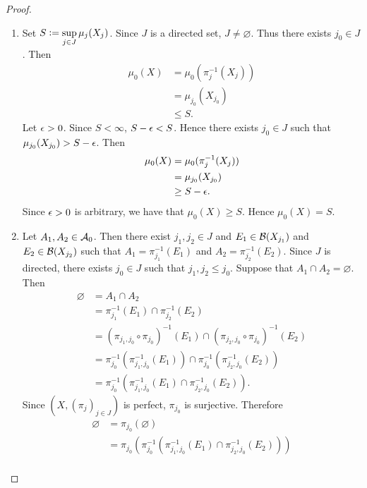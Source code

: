 \documentclass{book}
\begin{document}
\begin{proof}
\begin{enumerate}
\begin{align*}
				& = \mu_0((\pi_{j_2, j_0} \circ \pi_{j_0})^{-1}(E_2)) \\
				& = \mu_0(\pi_{j_2}^{-1}(E_2)) \\
				& = \mu_0(A_2).
			\end{align*}
			Thus $\mu_0$ is well-defined.
			\item Set $S \vcentcolon= \sup\limits_{j \in J} \mu_j(X_j)$. Since $J$ is a directed set, $J \neq \varnothing$. Thus there exists $j_0 \in J$. Then
			\begin{align*}
				\mu_0(X) 
				& = \mu_0(\pi_j^{-1}(X_j)) \\
				& = \mu_{j_0}(X_{j_0}) \\
				& \leq S.
			\end{align*}
			Let $\epsilon > 0$. Since $S < \infty$, $S - \epsilon < S$. Hence there exists $j_0 \in J$ such that $\mu_{j_0}(X_{j_0}) > S - \epsilon$. Then 
			\begin{align*}
				\mu_0(X) 
				& = \mu_0(\pi_j^{-1}(X_j)) \\
				& = \mu_{j_0}(X_{j_0}) \\
				& \geq S - \epsilon.
			\end{align*}
			Since $\epsilon > 0$ is arbitrary, we have that $\mu_0(X) \geq S$. Hence $\mu_0(X) = S$.
			\item Let $A_1, A_2 \in \mathcal{A}_0$. Then there exist $j_1, j_2 \in J$ and $E_1 \in \mathcal{B}(X_{j_1})$ and $E_2 \in \mathcal{B}(X_{j_2})$ such that $A_1 = \pi_{j_1}^{-1}(E_1)$ and $A_2 = \pi_{j_2}^{-1}(E_2)$. Since $J$ is directed, there exists $j_0 \in J$ such that $j_1, j_2 \leq j_0$. Suppose that $A_1 \cap A_2 = \varnothing$. Then  
			\begin{align*}
				\varnothing
				& = A_1 \cap A_2 \\
				& = \pi_{j_1}^{-1}(E_1) \cap \pi_{j_2}^{-1}(E_2) \\
				& = (\pi_{j_1, j_0} \circ \pi_{j_0})^{-1}(E_1) \cap  (\pi_{j_2, j_0} \circ \pi_{j_0})^{-1}(E_2) \\
				& = \pi_{j_0}^{-1}(\pi_{j_1, j_0}^{-1}(E_1)) \cap \pi_{j_0}^{-1}(\pi_{j_2, j_0}^{-1}(E_2)) \\
				& = \pi_{j_0}^{-1}(\pi_{j_1, j_0}^{-1}(E_1) \cap \pi_{j_2, j_0}^{-1}(E_2)).
			\end{align*}	
			Since $(X, (\pi_j)_{j \in J})$ is perfect, $\pi_{j_0}$ is surjective. Therefore
			\begin{align*}
				\varnothing
				& = \pi_{j_0}(\varnothing) \\
				& = \pi_{j_0}(\pi_{j_0}^{-1}(\pi_{j_1, j_0}^{-1}(E_1) \cap \pi_{j_2, j_0}^{-1}(E_2))) \\

\end{align*}
\end{enumerate}
\end{proof}
\end{document}
